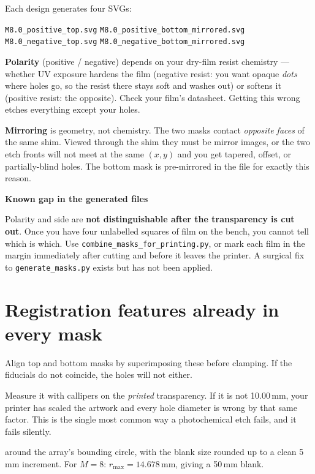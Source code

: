 \documentclass[11pt]{report}
\newenvironment{warnbox}[1]%
{\par\vspace{8pt}\begin{lrbox}{\wbsave}\begin{minipage}{0.88\textwidth}%
{\bfseries\color{warnred}#1}\par\vspace{4pt}\ignorespaces}%
{\end{minipage}\end{lrbox}%
\begin{center}\setlength{\fboxrule}{1.2pt}\setlength{\fboxsep}{8pt}%
\fcolorbox{warnred}{white}{\usebox{\wbsave}}\end{center}\vspace{8pt}\par}
\begin{document}
Each design generates four SVGs:
\begin{center}
\texttt{M8.0\_positive\_top.svg} \quad \texttt{M8.0\_positive\_bottom\_mirrored.svg}\\
\texttt{M8.0\_negative\_top.svg} \quad \texttt{M8.0\_negative\_bottom\_mirrored.svg}
\end{center}

\textbf{Polarity} (positive / negative) depends on your dry-film resist chemistry --- whether UV
exposure hardens the film (negative resist: you want opaque \emph{dots} where holes go, so the
resist there stays soft and washes out) or softens it (positive resist: the opposite). Check your
film's datasheet. Getting this wrong etches everything except your holes.

\textbf{Mirroring} is geometry, not chemistry. The two masks contact \emph{opposite faces} of the
same shim. Viewed through the shim they must be mirror images, or the two etch fronts will not
meet at the same $(x,y)$ and you get tapered, offset, or partially-blind holes. The bottom mask
is pre-mirrored in the file for exactly this reason.

\begin{warnbox}{Known gap in the generated files}
Polarity and side are \textbf{not distinguishable after the transparency is cut out}. Once you
have four unlabelled squares of film on the bench, you cannot tell which is which. Use
\texttt{combine\_masks\_for\_printing.py}, or mark each film in the margin immediately after
cutting and before it leaves the printer. A surgical fix to \texttt{generate\_masks.py} exists
but has not been applied.
\end{warnbox}

\section{Registration features already in every mask}

\begin{description}[leftmargin=0.8cm,style=nextline]
\item[Fiducial dots, $r = 0.75$\,mm, at the corners.] Align top and bottom masks by
superimposing these before clamping. If the fiducials do not coincide, the holes will not either.
\item[Calibration square, exactly 10.0\,mm.] Measure it with callipers on the \emph{printed}
transparency. If it is not 10.00\,mm, your printer has scaled the artwork and every hole diameter
is wrong by that same factor. This is the single most common way a photochemical etch fails, and
it fails silently.
\item[Blank margin, 8\,mm] around the array's bounding circle, with the blank size rounded up to a
clean 5\,mm increment. For $M=8$: $r_{\max} = 14.678$\,mm, giving a 50\,mm blank.
\end{description}
\end{document}
